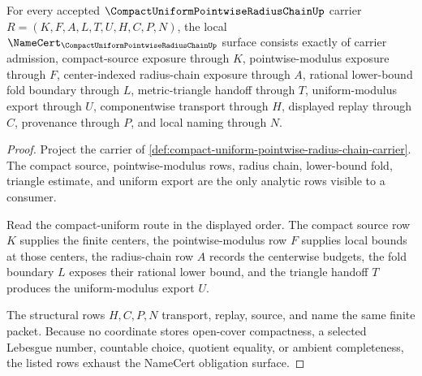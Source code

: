 \begin{theorem}
\label{thm:compact-uniform-pointwise-radius-chain-obligations}
For every accepted $\CompactUniformPointwiseRadiusChainUp$ carrier $R=(K,F,A,L,T,U,H,C,P,N)$, the local $\NameCert_{\CompactUniformPointwiseRadiusChainUp}$ surface consists exactly of carrier admission, compact-source exposure through $K$, pointwise-modulus exposure through $F$, center-indexed radius-chain exposure through $A$, rational lower-bound fold boundary through $L$, metric-triangle handoff through $T$, uniform-modulus export through $U$, componentwise transport through $H$, displayed replay through $C$, provenance through $P$, and local naming through $N$.
\end{theorem}
\begin{proof}
Project the carrier of \autoref{def:compact-uniform-pointwise-radius-chain-carrier}. The compact source, pointwise-modulus rows, radius chain, lower-bound fold, triangle estimate, and uniform export are the only analytic rows visible to a consumer.

Read the compact-uniform route in the displayed order. The compact source row $K$ supplies the finite centers, the pointwise-modulus row $F$ supplies local bounds at those centers, the radius-chain row $A$ records the centerwise budgets, the fold boundary $L$ exposes their rational lower bound, and the triangle handoff $T$ produces the uniform-modulus export $U$.

The structural rows $H,C,P,N$ transport, replay, source, and name the same finite packet. Because no coordinate stores open-cover compactness, a selected Lebesgue number, countable choice, quotient equality, or ambient completeness, the listed rows exhaust the NameCert obligation surface.
\end{proof}


